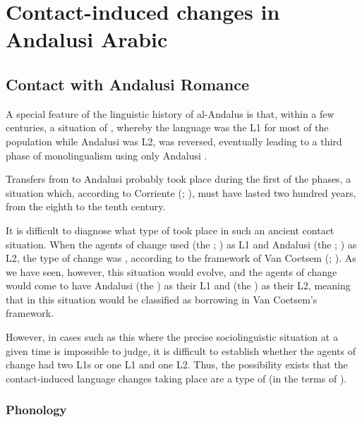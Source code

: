 \documentclass[output=paper,modfonts,nonflat]{langsci/langscibook}
\begin{document}
\section{Contact-induced changes in Andalusi Arabic} 

\subsection{Contact with Andalusi Romance}

A special feature of the linguistic history of al-Andalus is that, within a few centuries, a situation of , whereby the  language was the L1 for most of the population while Andalusi  was L2, was reversed, eventually leading to a third phase of monolingualism using only Andalusi . 

Transfers from  to Andalusi  probably took place during the first of the  phases, a situation which, according to Corriente (\citeyear{Corriente2005};  \citeyear{Corriente2008}), must have lasted two hundred years, from the eighth to the tenth century. 

It is difficult to diagnose what type of  took place in such an ancient contact situation. When the agents of change used  (the ; ) as L1 and Andalusi  (the ; ) as L2, the type of change was , according to the framework of Van Coetsem (\citeyear{VanCoetsem1988}; \citeyear{VanCoetsem2000}). As we have seen, however, this situation would evolve, and the agents of change would come to have Andalusi  (the ) as their L1 and  (the ) as their L2, meaning that  in this situation would be classified as borrowing in Van Coetsem’s framework. 

However, in cases such as this where the precise sociolinguistic situation at a given time is impossible to judge, it is difficult to establish whether the agents of change had two L1s or one L1 and one L2. Thus, the possibility exists that the contact-induced language changes taking place are a  type of  (in the terms of \citealt{Lucas2015}). 




\subsubsection{\label{bkm:Ref12959774}Phonology}
\end{document}
